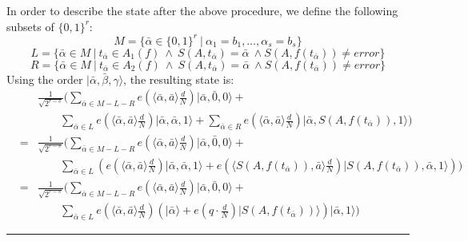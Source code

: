 \documentclass[11pt]{article}
\newcommand{\qedsymb}{\hfill{\rule{2mm}{2mm}}}
\newenvironment{proof}{\begin{trivlist}
\item[\hspace{\labelsep}{\sl\noindent Proof:\/}]
}{\qedsymb\end{trivlist}}
\def\balpha{\bar{\alpha}}
\def\bbeta{\bar{\beta}}
\newcommand\ket[1]{{ |{#1} \rangle }}
\newcommand\alternate[2]{{#1}}
\begin{document}
\begin{proof}
In order to describe the state after the above procedure, we define the following subsets of $\{0,1\}^r$:
$$ M=\{ \balpha \in \{0,1\}^r ~|~ \alpha_1=b_1,\ldots,\alpha_s=b_s\} $$
$$ L=\{ \balpha \in M ~|~ t_{\balpha} \in A_1(f) ~\wedge~ S(A,t_{\balpha})=\balpha ~\wedge S(A,f(t_{\balpha}))\neq error \} $$
$$ R=\{ \balpha \in M ~|~ t_{\balpha} \in A_2(f) ~\wedge~ S(A,t_{\balpha})=\balpha ~\wedge S(A,f(t_{\balpha}))\neq error \} $$
Using the order $\ket{\balpha,\bbeta,\gamma}$, the resulting state is:
\alternate{\begin{eqnarray*}
&&\frac{1}{\sqrt{2^{r-s}}}(
  \sum_{\balpha \in M-L-R} e(\langle\balpha,\bar{a}\rangle \frac{d}{N} ) \ket{\balpha, \bar{0},0} +\\
&& \qquad  \sum_{\balpha \in L} e(\langle\balpha,\bar{a}\rangle \frac{d}{N} ) \ket{\balpha,\balpha,1} +
  \sum_{\balpha \in R} e(\langle\balpha,\bar{a}\rangle \frac{d}{N} )\ket{\balpha,S(A,f(t_{\balpha})),1})\\
&=& \frac{1}{\sqrt{2^{r-s}}}(
  \sum_{\balpha \in M-L-R} e(\langle\balpha,\bar{a}\rangle \frac{d}{N} ) \ket{\balpha, \bar{0},0} +\\
&&\qquad  \sum_{\balpha \in L} (e(\langle\balpha,\bar{a}\rangle \frac{d}{N} )\ket{\balpha,\balpha,1} +
                       e(\langle S(A,f(t_{\balpha})),\bar{a}\rangle \frac{d}{N} )\ket{S(A,f(t_{\balpha})),\balpha,1}))\\
&=& \frac{1}{\sqrt{2^{r-s}}}(
  \sum_{\balpha \in M-L-R} e(\langle\balpha,\bar{a}\rangle \frac{d}{N} ) \ket{\balpha, \bar{0},0} +\\
&&\qquad  \sum_{\balpha \in L} e(\langle\balpha,\bar{a}\rangle \frac{d}{N} ) ( \ket{\balpha}+ e(q\cdot \frac{d}{N})
\ket{S(A,f(t_{\balpha}))})\ket{\balpha, 1})
\end{eqnarray*}}{\begin{eqnarray*}
&&\frac{1}{\sqrt{2^{r-s}}}(
  \sum_{\balpha \in M-L-R} e(\langle\balpha,\bar{a}\rangle \frac{d}{N} ) \ket{\balpha, \bar{0},0} +
  \sum_{\balpha \in L} e(\langle\balpha,\bar{a}\rangle \frac{d}{N} ) \ket{\balpha,\balpha,1} +
  \sum_{\balpha \in R} e(\langle\balpha,\bar{a}\rangle \frac{d}{N} )\ket{\balpha,S(A,f(t_{\balpha})),1})\\
&=& \frac{1}{\sqrt{2^{r-s}}}(
  \sum_{\balpha \in M-L-R} e(\langle\balpha,\bar{a}\rangle \frac{d}{N} ) \ket{\balpha, \bar{0},0} +\\
&&\qquad  \sum_{\balpha \in L} (e(\langle\balpha,\bar{a}\rangle \frac{d}{N} )\ket{\balpha,\balpha,1} +
                       e(\langle S(A,f(t_{\balpha})),\bar{a}\rangle \frac{d}{N} )\ket{S(A,f(t_{\balpha})),\balpha,1}))\\
&=& \frac{1}{\sqrt{2^{r-s}}}(
  \sum_{\balpha \in M-L-R} e(\langle\balpha,\bar{a}\rangle \frac{d}{N} ) \ket{\balpha, \bar{0},0} +
  \sum_{\balpha \in L} e(\langle\balpha,\bar{a}\rangle \frac{d}{N} ) ( \ket{\balpha}+ e(q\cdot \frac{d}{N})
\ket{S(A,f(t_{\balpha}))})\ket{\balpha, 1})
\end{eqnarray*}}


\end{proof}
\end{document}
